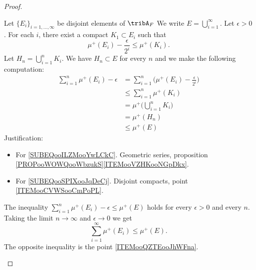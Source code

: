 \begin{proof}
\begin{subproof}
		\spitem[ \( \mu^+(\bigcup_{n=1}^{\infty}E_i)=\sum_{i=1}^{\infty}\mu^+(E_i)\) is \( E_i\) are disjoint in \( \tribA_F\) ]       \label{ITEMooJHIAooVoHLqt}

		Let \( \{ E_i \}_{i=1,\ldots, \infty}\) be disjoint elements of \( \tribA_F\) We write \( E=\bigcup_{i=1}^{\infty}\). Let \( \epsilon>0\). For each \( i\), there exist a compact \( K_1\subset E_i\) such that
		\begin{equation}
			\mu^+(E_i)-\frac{ \epsilon }{ 2^i }\leq \mu^+(K_i).
		\end{equation}
		Let \( H_n=\bigcup_{i=1}^nK_i\). We have \( H_n\subset E\) for every \( n\) and we make the following computation:
		\begin{subequations}               \label{SUBEQooHCNFooFmHJoJ}
			\begin{align}
				\sum_{i=1}^n\mu^+(E_i)-\epsilon & =\sum_{i=1}^n\Big( \mu^+(E_i)-\frac{ \epsilon }{ 2^i } \Big)       \label{SUBEQooILZMooYwLCkC} \\
				                                & \leq \sum_{i=1}^n\mu^+(K_i)                                                                    \\
				                                & =\mu^+\big( \bigcup_{i=1}^nK_i \big)      \label{SUBEQooSPIXooJqDeCj}                          \\
				                                & =\mu^+(H_n)                                                                                    \\
				                                & \leq \mu^+(E)     \label{SUNEQooFUWQooFzxDxO}
			\end{align}
		\end{subequations}
		Justification:
		\begin{itemize}
			\item For \eqref{SUBEQooILZMooYwLCkC}. Geometric series, proposition \ref{PROPooWOWQooWbzukS}\ref{ITEMooVZHKooNGpDkx}.
			\item For \eqref{SUBEQooSPIXooJqDeCj}. Disjoint compacts, point \ref{ITEMooCVWSooCmPoPL}.
		\end{itemize}
		The inequality \( \sum_{i=1}^n\mu^+(E_i)-\epsilon\leq \mu^+(E)\) holds for every \( \epsilon>0\) and every \( n\). Taking the limit \( n\to \infty\) and \( \epsilon\to 0\) we get
		\begin{equation}
			\sum_{i=1}^{\infty}\mu^+(E_i)\leq \mu^+(E).
		\end{equation}
		The opposite inequality is the point \ref{ITEMooQZTEooJhWFna}.


\end{subproof}
\end{proof}
